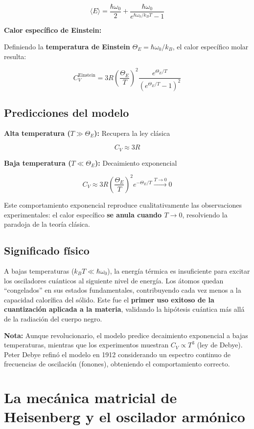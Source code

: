 \documentclass[11pt,a4paper,spanish]{book}
\begin{document}
\[
\langle E \rangle = \frac{\hbar\omega_0}{2} + \frac{\hbar\omega_0}{e^{\hbar\omega_0/k_B T} - 1}
\]

\textbf{Calor específico de Einstein:}

Definiendo la \textbf{temperatura de Einstein} $\Theta_E = \hbar\omega_0/k_B$, el calor específico molar resulta:

\[
C_V^{\text{Einstein}} = 3R \left(\frac{\Theta_E}{T}\right)^2 \frac{e^{\Theta_E/T}}{(e^{\Theta_E/T} - 1)^2}
\]

\subsection*{Predicciones del modelo}

\textbf{Alta temperatura ($T \gg \Theta_E$):} Recupera la ley clásica

\[
C_V \approx 3R
\]

\textbf{Baja temperatura ($T \ll \Theta_E$):} Decaimiento exponencial

\[
C_V \approx 3R \left(\frac{\Theta_E}{T}\right)^2 e^{-\Theta_E/T} \xrightarrow{T \to 0} 0
\]

Este comportamiento exponencial reproduce cualitativamente las observaciones experimentales: el calor específico \textbf{se anula cuando $T \to 0$}, resolviendo la paradoja de la teoría clásica.

\subsection*{Significado físico}

A bajas temperaturas ($k_B T \ll \hbar\omega_0$), la energía térmica es insuficiente para excitar los osciladores cuánticos al siguiente nivel de energía. Los átomos quedan ``congelados'' en sus estados fundamentales, contribuyendo cada vez menos a la capacidad calorífica del sólido. Este fue el \textbf{primer uso exitoso de la cuantización aplicada a la materia}, validando la hipótesis cuántica más allá de la radiación del cuerpo negro.

\textbf{Nota:} Aunque revolucionario, el modelo predice decaimiento exponencial a bajas temperaturas, mientras que los experimentos muestran $C_V \propto T^3$ (ley de Debye). Peter Debye \citep{debye1912} refinó el modelo en 1912 considerando un espectro continuo de frecuencias de oscilación (fonones), obteniendo el comportamiento correcto.

\section{La mecánica matricial de Heisenberg y el oscilador armónico} \label{sec:heisenberg}
\end{document}
